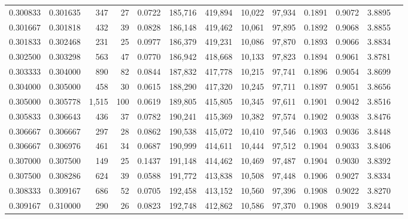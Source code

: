 \begin{tabular}{rrrrrrrrrrrrr}
0.300833 & 0.301635 &   347 &  27 &                                     0.0722 & 185,716 & 419,894 &  10,022 &  97,934 & 0.1891 & 0.9072 & 3.8895 \\
0.301667 & 0.301818 &   432 &  39 &                                     0.0828 & 186,148 & 419,462 &  10,061 &  97,895 & 0.1892 & 0.9068 & 3.8855 \\
0.301833 & 0.302468 &   231 &  25 &                                     0.0977 & 186,379 & 419,231 &  10,086 &  97,870 & 0.1893 & 0.9066 & 3.8834 \\
0.302500 & 0.303298 &   563 &  47 &                                     0.0770 & 186,942 & 418,668 &  10,133 &  97,823 & 0.1894 & 0.9061 & 3.8781 \\
0.303333 & 0.304000 &   890 &  82 &                                     0.0844 & 187,832 & 417,778 &  10,215 &  97,741 & 0.1896 & 0.9054 & 3.8699 \\
0.304000 & 0.305000 &   458 &  30 &                                     0.0615 & 188,290 & 417,320 &  10,245 &  97,711 & 0.1897 & 0.9051 & 3.8656 \\
0.305000 & 0.305778 & 1,515 & 100 &                                     0.0619 & 189,805 & 415,805 &  10,345 &  97,611 & 0.1901 & 0.9042 & 3.8516 \\
0.305833 & 0.306643 &   436 &  37 &                                     0.0782 & 190,241 & 415,369 &  10,382 &  97,574 & 0.1902 & 0.9038 & 3.8476 \\
0.306667 & 0.306667 &   297 &  28 &                                     0.0862 & 190,538 & 415,072 &  10,410 &  97,546 & 0.1903 & 0.9036 & 3.8448 \\
0.306667 & 0.306976 &   461 &  34 &                                     0.0687 & 190,999 & 414,611 &  10,444 &  97,512 & 0.1904 & 0.9033 & 3.8406 \\
0.307000 & 0.307500 &   149 &  25 &                                     0.1437 & 191,148 & 414,462 &  10,469 &  97,487 & 0.1904 & 0.9030 & 3.8392 \\
0.307500 & 0.308286 &   624 &  39 &                                     0.0588 & 191,772 & 413,838 &  10,508 &  97,448 & 0.1906 & 0.9027 & 3.8334 \\
0.308333 & 0.309167 &   686 &  52 &                                     0.0705 & 192,458 & 413,152 &  10,560 &  97,396 & 0.1908 & 0.9022 & 3.8270 \\
0.309167 & 0.310000 &   290 &  26 &                                     0.0823 & 192,748 & 412,862 &  10,586 &  97,370 & 0.1908 & 0.9019 & 3.8244 \\

\end{tabular}
